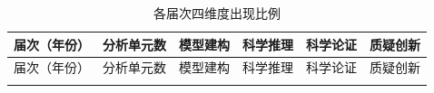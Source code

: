 \documentclass[
  12pt,
  a4paper]{ctexbook}
\begin{document}
\begin{longtable}[]{@{}
  >{\raggedright\arraybackslash}p{}
  >{\raggedleft\arraybackslash}p{}
  >{\raggedleft\arraybackslash}p{}
  >{\raggedleft\arraybackslash}p{}
  >{\raggedleft\arraybackslash}p{}
  >{\raggedleft\arraybackslash}p{}@{}}
\caption{各届次四维度出现比例}\tabularnewline
\toprule\noalign{}
\rowcolor{ThesisPale}
\begin{minipage}[b]{\linewidth}\raggedright
届次（年份）
\end{minipage} & \begin{minipage}[b]{\linewidth}\raggedleft
分析单元数
\end{minipage} & \begin{minipage}[b]{\linewidth}\raggedleft
模型建构
\end{minipage} & \begin{minipage}[b]{\linewidth}\raggedleft
科学推理
\end{minipage} & \begin{minipage}[b]{\linewidth}\raggedleft
科学论证
\end{minipage} & \begin{minipage}[b]{\linewidth}\raggedleft
质疑创新
\end{minipage} \\
\midrule\noalign{}
\endfirsthead
\toprule\noalign{}
\rowcolor{ThesisPale}
\begin{minipage}[b]{\linewidth}\raggedright
届次（年份）
\end{minipage} & \begin{minipage}[b]{\linewidth}\raggedleft
分析单元数
\end{minipage} & \begin{minipage}[b]{\linewidth}\raggedleft
模型建构
\end{minipage} & \begin{minipage}[b]{\linewidth}\raggedleft
科学推理
\end{minipage} & \begin{minipage}[b]{\linewidth}\raggedleft
科学论证
\end{minipage} & \begin{minipage}[b]{\linewidth}\raggedleft
质疑创新
\end{minipage} \\
\midrule\noalign{}

\end{longtable}
\end{document}
